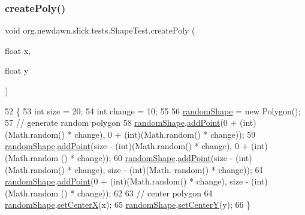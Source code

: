 \subsubsection{\texorpdfstring{create\+Poly()}{createPoly()}}
{\footnotesize\ttfamily void org.\+newdawn.\+slick.\+tests.\+Shape\+Test.\+create\+Poly (\begin{DoxyParamCaption}\item[{float}]{x,  }\item[{float}]{y }\end{DoxyParamCaption})\hspace{0.3cm}{\ttfamily [inline]}}


\begin{DoxyCode}
52                                              \{
53         \textcolor{keywordtype}{int} size = 20;
54         \textcolor{keywordtype}{int} change = 10;
55 
56         \mbox{\hyperlink{classorg_1_1newdawn_1_1slick_1_1tests_1_1_shape_test_a6a63648419db86ebc316f549aef8254a}{randomShape}} = \textcolor{keyword}{new} Polygon();
57         \textcolor{comment}{// generate random polygon}
58         \mbox{\hyperlink{classorg_1_1newdawn_1_1slick_1_1tests_1_1_shape_test_a6a63648419db86ebc316f549aef8254a}{randomShape}}.\mbox{\hyperlink{classorg_1_1newdawn_1_1slick_1_1geom_1_1_polygon_a62d22ea48361fe38f8868f1f126a7b7a}{addPoint}}(0 + (\textcolor{keywordtype}{int})(Math.random() * change), 0 + (\textcolor{keywordtype}{int})(Math.random() 
      * change));
59         \mbox{\hyperlink{classorg_1_1newdawn_1_1slick_1_1tests_1_1_shape_test_a6a63648419db86ebc316f549aef8254a}{randomShape}}.\mbox{\hyperlink{classorg_1_1newdawn_1_1slick_1_1geom_1_1_polygon_a62d22ea48361fe38f8868f1f126a7b7a}{addPoint}}(size - (\textcolor{keywordtype}{int})(Math.random() * change), 0 + (\textcolor{keywordtype}{int})(Math.random
      () * change));
60         \mbox{\hyperlink{classorg_1_1newdawn_1_1slick_1_1tests_1_1_shape_test_a6a63648419db86ebc316f549aef8254a}{randomShape}}.\mbox{\hyperlink{classorg_1_1newdawn_1_1slick_1_1geom_1_1_polygon_a62d22ea48361fe38f8868f1f126a7b7a}{addPoint}}(size - (\textcolor{keywordtype}{int})(Math.random() * change), size - (\textcolor{keywordtype}{int})(Math.
      random() * change));
61         \mbox{\hyperlink{classorg_1_1newdawn_1_1slick_1_1tests_1_1_shape_test_a6a63648419db86ebc316f549aef8254a}{randomShape}}.\mbox{\hyperlink{classorg_1_1newdawn_1_1slick_1_1geom_1_1_polygon_a62d22ea48361fe38f8868f1f126a7b7a}{addPoint}}(0 + (\textcolor{keywordtype}{int})(Math.random() * change), size - (\textcolor{keywordtype}{int})(Math.random
      () * change));
62     
63         \textcolor{comment}{// center polygon}
64         \mbox{\hyperlink{classorg_1_1newdawn_1_1slick_1_1tests_1_1_shape_test_a6a63648419db86ebc316f549aef8254a}{randomShape}}.\mbox{\hyperlink{classorg_1_1newdawn_1_1slick_1_1geom_1_1_shape_a226acf8b556b14ac2c3e2a7156f13c94}{setCenterX}}(x);
65         \mbox{\hyperlink{classorg_1_1newdawn_1_1slick_1_1tests_1_1_shape_test_a6a63648419db86ebc316f549aef8254a}{randomShape}}.\mbox{\hyperlink{classorg_1_1newdawn_1_1slick_1_1geom_1_1_shape_ad9ff9a26b4cb2799696bdc938965b2fc}{setCenterY}}(y);
66     \}
\end{DoxyCode}

